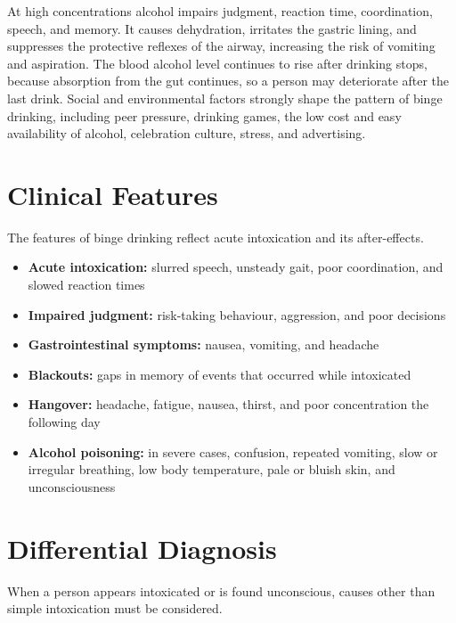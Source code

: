 At high concentrations alcohol impairs judgment, reaction time, coordination, speech, and memory. It causes dehydration, irritates the gastric lining, and suppresses the protective reflexes of the airway, increasing the risk of vomiting and aspiration. The blood alcohol level continues to rise after drinking stops, because absorption from the gut continues, so a person may deteriorate after the last drink. Social and environmental factors strongly shape the pattern of binge drinking, including peer pressure, drinking games, the low cost and easy availability of alcohol, celebration culture, stress, and advertising.

\section*{Clinical Features}
The features of binge drinking reflect acute intoxication and its after-effects.

\begin{itemize}
    \item \textbf{Acute intoxication:} slurred speech, unsteady gait, poor coordination, and slowed reaction times
    \item \textbf{Impaired judgment:} risk-taking behaviour, aggression, and poor decisions
    \item \textbf{Gastrointestinal symptoms:} nausea, vomiting, and headache
    \item \textbf{Blackouts:} gaps in memory of events that occurred while intoxicated
    \item \textbf{Hangover:} headache, fatigue, nausea, thirst, and poor concentration the following day
    \item \textbf{Alcohol poisoning:} in severe cases, confusion, repeated vomiting, slow or irregular breathing, low body temperature, pale or bluish skin, and unconsciousness
\end{itemize}

\section*{Differential Diagnosis}
When a person appears intoxicated or is found unconscious, causes other than simple intoxication must be considered.

